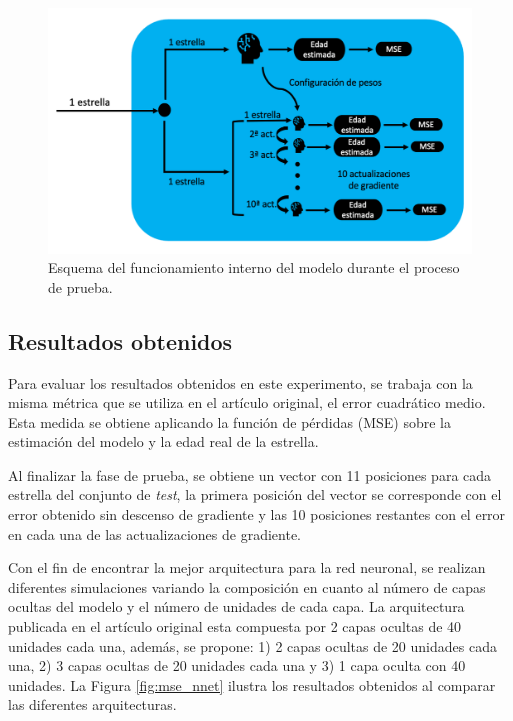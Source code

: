 \begin{figure}[H]
\begin{center}
 \includegraphics[width=0.8\linewidth]{Figuras/MAML/maml_core_test.pdf}
\end{center}
\caption{Esquema del funcionamiento interno del modelo durante el proceso de prueba.}
 \label{fig:core_maml_test}
\end{figure}


\subsection{Resultados obtenidos} 

Para evaluar los resultados obtenidos en este experimento, se trabaja con la misma métrica que se utiliza en el artículo original, el error cuadrático medio. Esta medida se obtiene aplicando la función de pérdidas (MSE) sobre la estimación del modelo y la edad real de la estrella. 

Al finalizar la fase de prueba, se obtiene un vector con 11 posiciones para cada estrella del conjunto de \emph{test}, la primera posición del vector se corresponde con el error obtenido sin descenso de gradiente y las 10 posiciones restantes con el error en cada una de las actualizaciones de gradiente.


Con el fin de encontrar la mejor arquitectura para la red neuronal, se realizan diferentes simulaciones variando la composición en cuanto al número de capas ocultas del modelo y el número de unidades de cada capa. La arquitectura publicada en el artículo original esta compuesta por 2 capas ocultas de 40 unidades cada una, además, se propone: 1) 2 capas ocultas de 20 unidades cada una, 2) 3 capas ocultas de 20 unidades cada una y 3) 1 capa oculta con 40 unidades.
La Figura \ref{fig:mse_nnet} ilustra los resultados obtenidos al comparar las diferentes arquitecturas.

